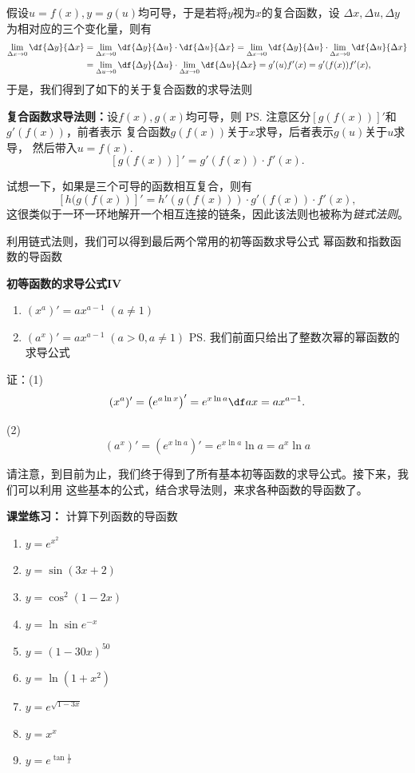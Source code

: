 假设$u=f(x),y=g(u)$均可导，于是若将$y$视为$x$的复合函数，设
$\Delta x,\Delta u,\Delta y$为相对应的三个变化量，则有
\begin{align*}
	\lim\limits_{\Delta x\to 0}\df{\Delta y}{\Delta x}
	&=\lim\limits_{\Delta x\to 0}\df{\Delta y}{\Delta u}
	\cdot\df{\Delta u}{\Delta x}
	=\lim\limits_{\Delta x\to 0}\df{\Delta y}{\Delta u}
	\cdot\lim\limits_{\Delta x\to 0}\df{\Delta u}{\Delta x}\\
	&=\lim\limits_{\Delta u\to 0}\df{\Delta y}{\Delta u}
	\cdot\lim\limits_{\Delta x\to 0}\df{\Delta u}{\Delta x}
	=g'(u)f'(x)=g'(f(x))f'(x),
\end{align*}
于是，我们得到了如下的关于复合函数的求导法则
\begin{thx}
	{\bf 复合函数求导法则：}设$f(x),g(x)$均可导，则
	\ps{\baa 注意区分$[g(f(x))]'$和$g'(f(x))$，前者表示
	复合函数$g(f(x))$关于$x$求导，后者表示$g(u)$关于$u$求导，
	然后带入$u=f(x)$.}
	$$[g(f(x))]'=g'(f(x))\cdot f'(x).$$
\end{thx}
试想一下，如果是三个可导的函数相互复合，则有
$$[h(g(f(x))]'=h'(g(f(x)))\cdot g'(f(x))\cdot f'(x),$$
这很类似于一环一环地解开一个相互连接的链条，因此该法则也被称为{\it 链式法则}。

\bs
利用链式法则，我们可以得到最后两个常用的初等函数求导公式
\egz 幂函数和指数函数的导函数
\begin{thx}
	{\bf 初等函数的求导公式IV}
	\begin{enumerate}[(1)]
	  \item $(x^a)'=ax^{a-1}\;(a\ne 1)$
	  \item $(a^x)'=ax^{a-1}\;(a>0,a\ne 1)$
	  \ps{我们前面只给出了整数次幂的幂函数的求导公式}
	\end{enumerate}
\end{thx}

证：(1)
$$(x^a)'=\left(e^{a\ln x}\right)'=e^{x\ln a}\df ax=ax^{a-1}.$$

(2)
$$(a^x)'=\left(e^{x\ln a}\right)'
=e^{x\ln a}\ln a=a^x\ln a$$
\fin

请注意，到目前为止，我们终于得到了所有基本初等函数的求导公式。接下来，我们可以利用
这些基本的公式，结合求导法则，来求各种函数的导函数了。

\bs
{\bf 课堂练习：} 计算下列函数的导函数
\begin{enumerate}[(1)]
  \setlength{\itemindent}{1cm}
  \item $y=e^{x^2}$ 
  \item $y=\sin (3x+2)$ 
  \item $y=\cos^2(1-2x)$ 
  \item $y=\ln\sin e^{-x}$ 
  \item $y=(1-30x)^{50}$ 
  \item $y=\ln(1+x^2)$ 
  \item $y=e^{\sqrt{1-3x}}$ 
  \item $y=x^x$ 
  \item $y=e^{\tan\frac 1x}$
\end{enumerate}

